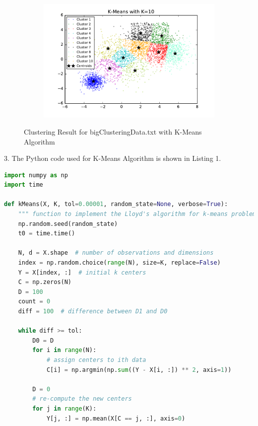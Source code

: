 \begin{description}
\begin{description}
\begin{figure}[!h]
\begin{subfigure}[b]{0.475\textwidth}
            \includegraphics[width=\textwidth]{./figures/bigClustering_kMeans_10.pdf}
        \end{subfigure}
        
        \caption{Clustering Result for bigClusteringData.txt with K-Means Algorithm}
        \label{fig:kmean_bigCustering}
\end{figure}

\newpage
\item{3.} The Python code used for K-Means Algorithm is shown in Listing 1.

\begin{lstlisting}[language=Python, caption={K-Means Algorithm Python Code}]
import numpy as np
import time

def kMeans(X, K, tol=0.00001, random_state=None, verbose=True):
    """ function to implement the Lloyd's algorithm for k-means problem """
    np.random.seed(random_state)
    t0 = time.time()

    N, d = X.shape  # number of observations and dimensions
    index = np.random.choice(range(N), size=K, replace=False)
    Y = X[index, :]  # initial k centers
    C = np.zeros(N)
    D = 100
    count = 0
    diff = 100  # difference between D1 and D0

    while diff >= tol:
        D0 = D
        for i in range(N):
            # assign centers to ith data
            C[i] = np.argmin(np.sum((Y - X[i, :]) ** 2, axis=1))

        D = 0
        # re-compute the new centers
        for j in range(K):
            Y[j, :] = np.mean(X[C == j, :], axis=0)


\end{lstlisting}
\end{description}
\end{description}
